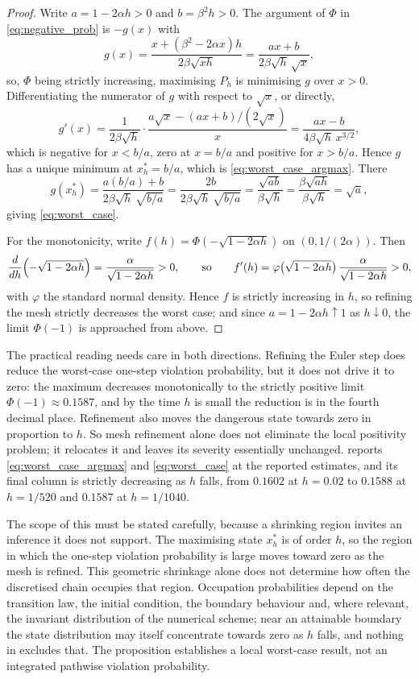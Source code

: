 \documentclass[11pt]{article}
\theoremstyle{definition}
\begin{document}
\begin{proof}
Write $a=1-2\alpha h>0$ and $b=\beta^2h>0$. The argument of $\Phi$ in \eqref{eq:negative_prob} is $-g(x)$ with
\[
g(x)=\frac{x+(\beta^2-2\alpha x)h}{2\beta\sqrt{xh}}=\frac{ax+b}{2\beta\sqrt h\,\sqrt x},
\]
so, $\Phi$ being strictly increasing, maximising $P_h$ is minimising $g$ over $x>0$. Differentiating the numerator of $g$ with respect to $\sqrt x$, or directly,
\[
g'(x)=\frac{1}{2\beta\sqrt h}\cdot\frac{a\sqrt x-(ax+b)/(2\sqrt x)}{x}
=\frac{ax-b}{4\beta\sqrt h\,x^{3/2}},
\]
which is negative for $x<b/a$, zero at $x=b/a$ and positive for $x>b/a$. Hence $g$ has a unique minimum at $x_h^*=b/a$, which is \eqref{eq:worst_case_argmax}. There
\[
g(x_h^*)=\frac{a(b/a)+b}{2\beta\sqrt h\,\sqrt{b/a}}=\frac{2b}{2\beta\sqrt h\,\sqrt{b/a}}=\frac{\sqrt{ab}}{\beta\sqrt h}=\frac{\beta\sqrt{ah}}{\beta\sqrt h}=\sqrt a,
\]
giving \eqref{eq:worst_case}.

For the monotonicity, write $f(h)=\Phi(-\sqrt{1-2\alpha h})$ on $(0,1/(2\alpha))$. Then
\[
\frac{d}{dh}\Bigl(-\sqrt{1-2\alpha h}\Bigr)=\frac{\alpha}{\sqrt{1-2\alpha h}}>0,
\qquad\text{so}\qquad
f'(h)=\varphi\bigl(\sqrt{1-2\alpha h}\bigr)\,\frac{\alpha}{\sqrt{1-2\alpha h}}>0,
\]
with $\varphi$ the standard normal density. Hence $f$ is strictly increasing in $h$, so refining the mesh strictly decreases the worst case; and since $a=1-2\alpha h\uparrow1$ as $h\downarrow0$, the limit $\Phi(-1)$ is approached from above.
\end{proof}

The practical reading needs care in both directions. Refining the Euler step does reduce the worst-case one-step violation probability, but it does not drive it to zero: the maximum decreases monotonically to the strictly positive limit $\Phi(-1)\approx0.1587$, and by the time $h$ is small the reduction is in the fourth decimal place. Refinement also moves the dangerous state towards zero in proportion to $h$. So mesh refinement alone does not eliminate the local positivity problem; it relocates it and leaves its severity essentially unchanged.  reports \eqref{eq:worst_case_argmax} and \eqref{eq:worst_case} at the reported estimates, and its final column is strictly decreasing as $h$ falls, from $0.1602$ at $h=0.02$ to $0.1588$ at $h=1/520$ and $0.1587$ at $h=1/1040$.

The scope of this must be stated carefully, because a shrinking region invites an inference it does not support. The maximising state $x_h^*$ is of order $h$, so the region in which the one-step violation probability is large moves toward zero as the mesh is refined. This geometric shrinkage alone does not determine how often the discretised chain occupies that region. Occupation probabilities depend on the transition law, the initial condition, the boundary behaviour and, where relevant, the invariant distribution of the numerical scheme; near an attainable boundary the state distribution may itself concentrate towards zero as $h$ falls, and nothing in  excludes that. The proposition establishes a local worst-case result, not an integrated pathwise violation probability.
\end{document}
